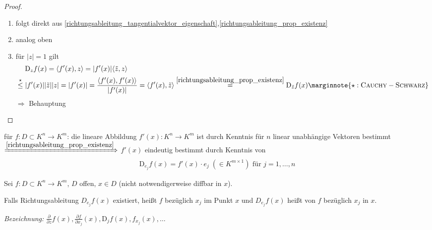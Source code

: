\begin{proof}\hspace*{0pt}
	\begin{enumerate}[label={\arabic*)},topsep=\dimexpr -\baselineskip / 2 \relax]
		\item folgt direkt aus \eqref{richtungsableitung_tangentialvektor_eigenschaft},\eqref{richtungsableitung_prop_existenz}
		\item analog oben
		\item für $\vert z \vert = 1$ gilt
		\zeroAmsmathAlignVSpaces \begin{align*}
			&\mathrm{D}_z f(x) = \langle f'(x), z \rangle = \vert f'(x) \vert \langle \tilde{z},z\rangle \\
			\overset{\star}{\le}\; &\vert f'(x) \vert  \vert \tilde{z}\vert \vert z \vert = \vert f'(x)\vert = \frac{\langle f'(x), f'(x)\rangle}{\vert f'(x) \vert} = \langle f'(x), \tilde{z} \rangle \overset{\eqref{richtungsableitung_prop_existenz}}{=} \mathrm{D}_{\tilde{z}}f(x)\marginnote{\star:\person{Cauchy} - \person{Schwarz}}
		\end{align*}
		$\Rightarrow$ Behauptung
	\end{enumerate}
\end{proof}

\begin{underlinedenvironment}[Feststellung]
	für $f:D\subset K^n\to K^m$: die lineare Abbildung $f'(x):K^n\to K^m$ ist durch Kenntnis für $n$ linear unabhängige Vektoren bestimmt\\
	$\xRightarrow{\eqref{richtungsableitung_prop_existenz}}$ $f'(x)$ eindeutig bestimmt durch Kenntnis von \begin{align*}
		\mathrm{D}_{e_j} f(x) = f'(x) \cdot e_j \;(\in K^{m\times 1}) \text{ für } j = 1,\dotsc,n
	\end{align*}
\end{underlinedenvironment}

\begin{*definition}
	Sei $f:D\subset K^n\to K^m$, $D$ offen, $x\in D$ (nicht notwendigerweise \gls{diffbar} in $x$).
	
	Falls Richtungsableitung $D_{e_j} f(x)$ existiert, heißt $f$  bezüglich $x_j$ im Punkt $x$ und $D_{e_j} f(x)$ heißt  von $f$ bezüglich $x_j$ in $x$.
	
	\emph{Bezeichnung:} $\frac{\partial }{\partial z}f(x), \frac{\partial f}{\partial x_j}(x), \mathrm{D}_j f(x), f_{x_j}(x), \dotsc$
\end{*definition}

